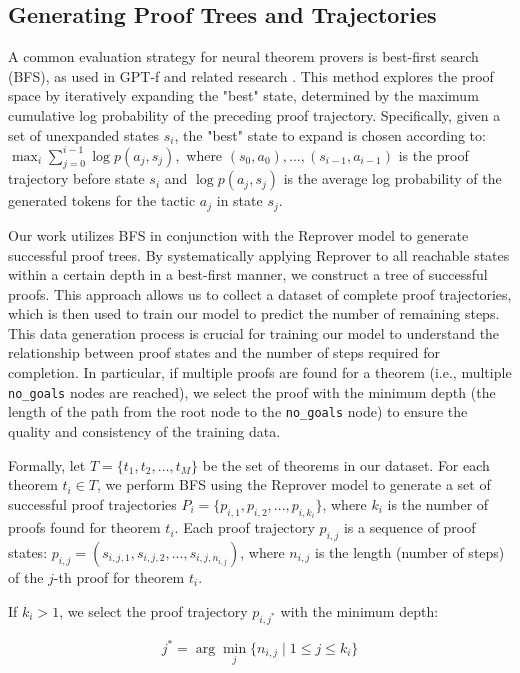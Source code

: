 \subsection{Generating Proof Trees and Trajectories}

A common evaluation strategy for neural theorem provers is best-first search (BFS), as used in GPT-f and related research \citep{han2021proof}. This method explores the proof space by iteratively expanding the "best" state, determined by the maximum cumulative log probability of the preceding proof trajectory. Specifically, given a set of unexpanded states $s_i$, the "best" state to expand is chosen according to:
$\max_i \sum_{j=0}^{i-1} \log p(a_j, s_j),$
where $(s_0, a_0), \dots, (s_{i-1}, a_{i-1})$ is the proof trajectory before state $s_i$ and $\log p(a_j, s_j)$ is the average log probability of the generated tokens for the tactic $a_j$ in state $s_j$.

Our work utilizes BFS in conjunction with the Reprover model \citep{yang2024leandojo} to generate successful proof trees. By systematically applying Reprover to all reachable states within a certain depth in a best-first manner, we construct a tree of successful proofs. This approach allows us to collect a dataset of complete proof trajectories, which is then used to train our model to predict the number of remaining steps. This data generation process is crucial for training our model to understand the relationship between proof states and the number of steps required for completion. In particular, if multiple proofs are found for a theorem (i.e., multiple \texttt{no\_goals} nodes are reached), we select the proof with the minimum depth (the length of the path from the root node to the \texttt{no\_goals} node) to ensure the quality and consistency of the training data.

Formally, let $T = \{t_1, t_2, ..., t_M\}$ be the set of theorems in our dataset. For each theorem $t_i \in T$, we perform BFS using the Reprover model to generate a set of successful proof trajectories $P_i = \{p_{i,1}, p_{i,2}, ..., p_{i,k_i}\}$, where $k_i$ is the number of proofs found for theorem $t_i$. Each proof trajectory $p_{i,j}$ is a sequence of proof states: $p_{i,j} = (s_{i,j,1}, s_{i,j,2}, ..., s_{i,j,n_{i,j}})$, where $n_{i,j}$ is the length (number of steps) of the $j$-th proof for theorem $t_i$.

If $k_i > 1$, we select the proof trajectory $p_{i,j^*}$ with the minimum depth:

\[
j^* = \arg\min_j \{n_{i,j} \mid 1 \le j \le k_i\}
\]

